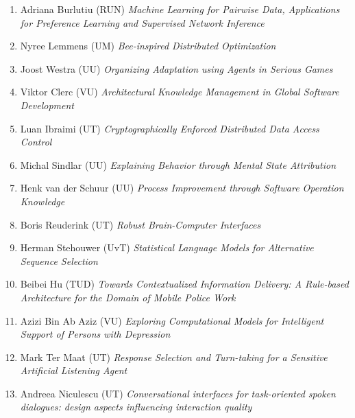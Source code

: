 \begin{multicols}{2}
\begin{scriptsize}
\begin{enumerate}[leftmargin=*,noitemsep,topsep=0pt,parsep=1pt,partopsep=0pt]
{}\item Adriana Burlutiu (RUN) \textit{Machine Learning for Pairwise Data, Applications for Preference Learning and Supervised Network Inference 
}\item Nyree Lemmens (UM) \textit{Bee-inspired Distributed Optimization
}\item Joost Westra (UU) \textit{Organizing Adaptation using Agents in Serious Games 
}\item Viktor Clerc (VU) \textit{Architectural Knowledge Management in Global Software Development 
}\item Luan Ibraimi (UT) \textit{Cryptographically Enforced Distributed Data Access Control 
}\item Michal Sindlar (UU) \textit{Explaining Behavior through Mental State Attribution 
}\item Henk van der Schuur (UU) \textit{Process Improvement through Software Operation Knowledge 
}\item Boris Reuderink (UT) \textit{Robust Brain-Computer Interfaces 
}\item Herman Stehouwer (UvT) \textit{Statistical Language Models for Alternative Sequence Selection 
}\item Beibei Hu (TUD) \textit{Towards Contextualized Information Delivery: A Rule-based Architecture for the Domain of Mobile Police Work 
}\item Azizi Bin Ab Aziz (VU) \textit{Exploring Computational Models for Intelligent Support of Persons with Depression 
}\item Mark Ter Maat (UT) \textit{Response Selection and Turn-taking for a Sensitive Artificial Listening Agent 
}\item Andreea Niculescu (UT) \textit{Conversational interfaces for task-oriented spoken dialogues: design aspects influencing interaction quality}
\end{enumerate}


\end{scriptsize}
\end{multicols}
